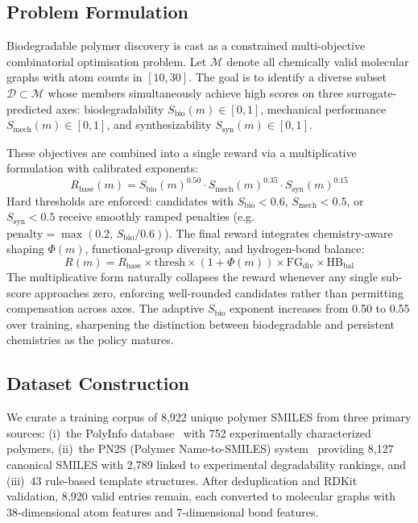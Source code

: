 \documentclass[twocolumn,10pt]{article}
\begin{document}
\subsection{Problem Formulation}
Biodegradable polymer discovery is cast as a constrained multi-objective combinatorial
optimisation problem. Let $\mathcal{M}$ denote all chemically valid molecular graphs with
atom counts in $[10, 30]$. The goal is to identify a diverse subset $\mathcal{D} \subset \mathcal{M}$
whose members simultaneously achieve high scores on three surrogate-predicted axes:
biodegradability $S_\text{bio}(m) \in [0,1]$, mechanical performance
$S_\text{mech}(m) \in [0,1]$, and synthesizability $S_\text{syn}(m) \in [0,1]$.

These objectives are combined into a single reward via a multiplicative formulation with
calibrated exponents:
\begin{equation}
R_\text{base}(m) = S_\text{bio}(m)^{0.50} \cdot S_\text{mech}(m)^{0.35} \cdot S_\text{syn}(m)^{0.15}
\label{eq:reward_base}
\end{equation}
Hard thresholds are enforced: candidates with $S_\text{bio} < 0.6$, $S_\text{mech} < 0.5$,
or $S_\text{syn} < 0.5$ receive smoothly ramped penalties (e.g.\
$\text{penalty} = \max(0.2,\, S_\text{bio}/0.6)$). The final reward integrates chemistry-aware
shaping $\Phi(m)$, functional-group diversity, and hydrogen-bond balance:
\begin{equation}
R(m) = R_\text{base} \times \text{thresh} \times (1 + \Phi(m)) \times \text{FG}_{\text{div}} \times \text{HB}_{\text{bal}}
\label{eq:reward}
\end{equation}
The multiplicative form naturally collapses the reward whenever any single sub-score approaches
zero, enforcing well-rounded candidates rather than permitting compensation across axes.
The adaptive $S_\text{bio}$ exponent increases from 0.50 to 0.55 over training, sharpening
the distinction between biodegradable and persistent chemistries as the policy matures.

\subsection{Dataset Construction}
We curate a training corpus of 8,922 unique polymer SMILES from three primary sources: (i)~the PolyInfo database~\cite{kim2018polymer} with 752 experimentally characterized polymers, (ii)~the PN2S (Polymer Name-to-SMILES) system~\cite{le2016discovery} providing 8,127 canonical SMILES with 2,789 linked to experimental degradability rankings, and (iii)~43 rule-based template structures. After deduplication and RDKit~\cite{landrum2023rdkit} validation, 8,920 valid entries remain, each converted to molecular graphs with 38-dimensional atom features and 7-dimensional bond features.
\end{document}
